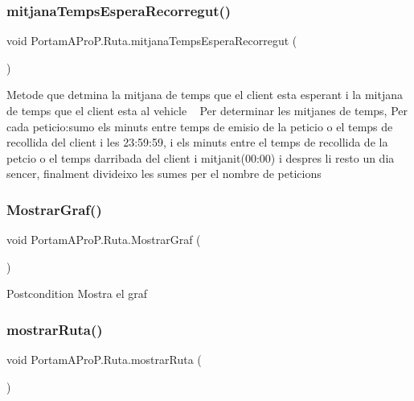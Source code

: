 \subsubsection{\texorpdfstring{mitjana\+Temps\+Espera\+Recorregut()}{mitjanaTempsEsperaRecorregut()}}
{\footnotesize\ttfamily void Portam\+A\+Pro\+P.\+Ruta.\+mitjana\+Temps\+Espera\+Recorregut (\begin{DoxyParamCaption}{ }\end{DoxyParamCaption})}

Metode que detmina la mitjana de temps que el client esta esperant i la mitjana de temps que el client esta al vehicle ~\newline
 Per determinar les mitjanes de temps, Per cada peticio\+:sumo els minuts entre temps de emisio de la peticio o el temps de recollida del client i les 23\+:59\+:59, i els minuts entre el temps de recollida de la petcio o el temps d\textquotesingle{}arribada del client i mitjanit(00\+:00) i despres li resto un dia sencer, finalment divideixo les sumes per el nombre de peticions \mbox{\label{class_portam_a_pro_p_1_1_ruta_ac0b686760e83d18cc6b3158c4fe4506e}} 
\subsubsection{\texorpdfstring{Mostrar\+Graf()}{MostrarGraf()}}
{\footnotesize\ttfamily void Portam\+A\+Pro\+P.\+Ruta.\+Mostrar\+Graf (\begin{DoxyParamCaption}{ }\end{DoxyParamCaption})}

\begin{DoxyPostcond}{Postcondition}
Mostra el graf 
\end{DoxyPostcond}
\mbox{\label{class_portam_a_pro_p_1_1_ruta_a35b6d0accf1a144ab616760ae2e34e49}} 
\subsubsection{\texorpdfstring{mostrar\+Ruta()}{mostrarRuta()}}
{\footnotesize\ttfamily void Portam\+A\+Pro\+P.\+Ruta.\+mostrar\+Ruta (\begin{DoxyParamCaption}{ }\end{DoxyParamCaption})}



